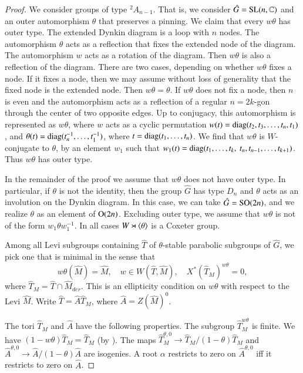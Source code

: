 \begin{proof}
We consider groups of type ${}^2A_{n-1}$.  That is, we consider $\hat
G = {\operatorname{SL}}(n,\mathbb{C})$ and an outer automorphism $\theta$ that
preserves a pinning.  We claim that every $w\theta$ has outer type.
The extended Dynkin diagram is a loop with $n$ nodes.  The
automorphism $\theta$ acts as a reflection that fixes the extended
node of the diagram.  The automorphism $w$ acts as a rotation of the
diagram.  Then $w \theta$ is also a reflection of the diagram.  There
are two cases, depending on whether $w\theta$ fixes a node.  If it
fixes a node, then we may assume without loss of generality that the
fixed node is the extended node.  Then $w\theta = \theta$.  If
$w\theta$ does not fix a node, then $n$ is even and the automorphism
acts as a reflection of a regular $n=2k$-gon through the center of two
opposite edges.  Up to conjugacy, this automorphism is represented as
$w\theta$, where $w $ acts as a cyclic permutation $w (t) =
{\operatorname{diag}}(t_2,t_3,\ldots,t_n,t_1)$, and $\theta(t) =
{\operatorname{diag}}(t_n^{-1},\ldots,t_1^{-1})$, where
$t={\operatorname{diag}}(t_1,\ldots,t_n)$.  We find that $w \theta$ is
$W$-conjugate to $\theta$, by an element $w_1$ such that $w_1(t) =
{\operatorname{diag}}(t_1,\ldots,t_k,\ t_n,t_{n-1},\ldots,t_{k+1})$. Thus
$w\theta$ has outer type.

In the remainder of the proof we assume that $w\theta$ does not have
outer type.  In particular, if $\theta$ is not the identity, then the
group $\hat G$ has type $D_n$ and $\theta$ acts as an involution on
the Dynkin diagram.  In this case, we can take $\hat G = {\operatorname{SO}}(2n)$, and
we realize $\theta$ as an element of ${\operatorname{O}}(2n)$.  Excluding outer type,
we assume that $w\theta$ is not of the form $w_1\theta w_1^{-1}$.  In
all cases $W\rtimes \langle{\theta}\rangle$ is a Coxeter group.

Among all Levi subgroups containing $\hat T$ of $\theta$-stable
parabolic subgroups of $\hat G$, we pick one that is minimal in the
sense that
\[
w\theta(\hat M) = \hat M,\quad w\in W(\hat T,\hat M),\quad X^*(\hat T_M)^{w\theta}=0,
\]
where $\hat T_M = \hat T\cap \hat M_{der}$.  This is an ellipticity
condition on $w\theta$ with respect to the Levi $\hat M$.
  Write $\hat T = \hat A\hat T_M$, where $\hat A = Z(\hat M)^0$.

The tori $\hat T_M$ and $\hat A$ have the following properties.  The
subgroup $\hat T_M^{w\theta}$ is finite.  We have $(1-w\theta)\hat T_M
= \hat T_M$ (by \cite[Theorem 10.1]{steinberg1968endomorphisms}).  The
maps $\hat T_M^{\theta,0} \to \hat T_M/(1-\theta)\hat T_M$ and $\hat
A^{\theta,0}\to \hat A/(1-\theta)\hat A$ are isogenies.  A root $\alpha$
restricts to zero on $\hat A^{\theta,0}$ iff it restricts to zero on $\hat A$.


\end{proof}
